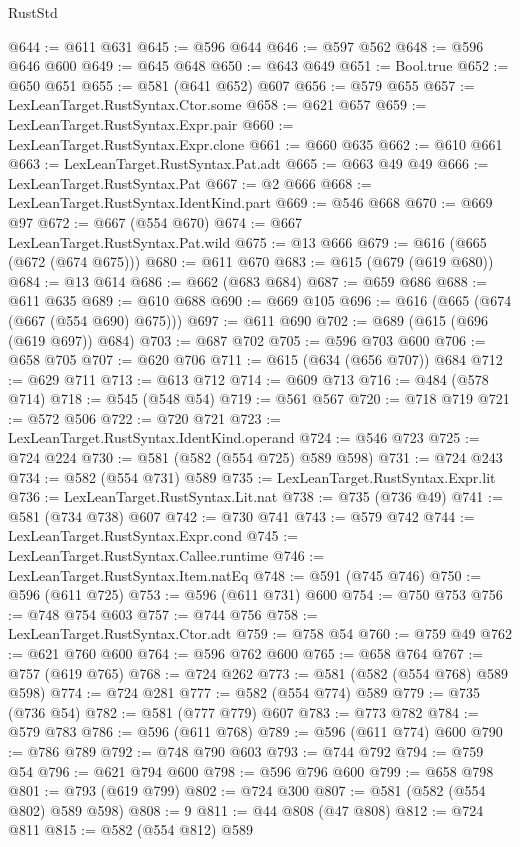 \begin{lexlean}{RustStd}
\begin{coremodule}
@644 := @611 @631
@645 := @596 @644
@646 := @597 @562
@648 := @596 @646 @600
@649 := @645 @648
@650 := @643 @649
@651 := Bool.true
@652 := @650 @651
@655 := @581 (@641 @652) @607
@656 := @579 @655
@657 := LexLeanTarget.RustSyntax.Ctor.some
@658 := @621 @657
@659 := LexLeanTarget.RustSyntax.Expr.pair
@660 := LexLeanTarget.RustSyntax.Expr.clone
@661 := @660 @635
@662 := @610 @661
@663 := LexLeanTarget.RustSyntax.Pat.adt
@665 := @663 @49 @49
@666 := LexLeanTarget.RustSyntax.Pat
@667 := @2 @666
@668 := LexLeanTarget.RustSyntax.IdentKind.part
@669 := @546 @668
@670 := @669 @97
@672 := @667 (@554 @670)
@674 := @667 LexLeanTarget.RustSyntax.Pat.wild
@675 := @13 @666
@679 := @616 (@665 (@672 (@674 @675)))
@680 := @611 @670
@683 := @615 (@679 (@619 @680))
@684 := @13 @614
@686 := @662 (@683 @684)
@687 := @659 @686
@688 := @611 @635
@689 := @610 @688
@690 := @669 @105
@696 := @616 (@665 (@674 (@667 (@554 @690) @675)))
@697 := @611 @690
@702 := @689 (@615 (@696 (@619 @697)) @684)
@703 := @687 @702
@705 := @596 @703 @600
@706 := @658 @705
@707 := @620 @706
@711 := @615 (@634 (@656 @707)) @684
@712 := @629 @711
@713 := @613 @712
@714 := @609 @713
@716 := @484 (@578 @714)
@718 := @545 (@548 @54)
@719 := @561 @567
@720 := @718 @719
@721 := @572 @506
@722 := @720 @721
@723 := LexLeanTarget.RustSyntax.IdentKind.operand
@724 := @546 @723
@725 := @724 @224
@730 := @581 (@582 (@554 @725) @589 @598)
@731 := @724 @243
@734 := @582 (@554 @731) @589
@735 := LexLeanTarget.RustSyntax.Expr.lit
@736 := LexLeanTarget.RustSyntax.Lit.nat
@738 := @735 (@736 @49)
@741 := @581 (@734 @738) @607
@742 := @730 @741
@743 := @579 @742
@744 := LexLeanTarget.RustSyntax.Expr.cond
@745 := LexLeanTarget.RustSyntax.Callee.runtime
@746 := LexLeanTarget.RustSyntax.Item.natEq
@748 := @591 (@745 @746)
@750 := @596 (@611 @725)
@753 := @596 (@611 @731) @600
@754 := @750 @753
@756 := @748 @754 @603
@757 := @744 @756
@758 := LexLeanTarget.RustSyntax.Ctor.adt
@759 := @758 @54
@760 := @759 @49
@762 := @621 @760 @600
@764 := @596 @762 @600
@765 := @658 @764
@767 := @757 (@619 @765)
@768 := @724 @262
@773 := @581 (@582 (@554 @768) @589 @598)
@774 := @724 @281
@777 := @582 (@554 @774) @589
@779 := @735 (@736 @54)
@782 := @581 (@777 @779) @607
@783 := @773 @782
@784 := @579 @783
@786 := @596 (@611 @768)
@789 := @596 (@611 @774) @600
@790 := @786 @789
@792 := @748 @790 @603
@793 := @744 @792
@794 := @759 @54
@796 := @621 @794 @600
@798 := @596 @796 @600
@799 := @658 @798
@801 := @793 (@619 @799)
@802 := @724 @300
@807 := @581 (@582 (@554 @802) @589 @598)
@808 := 9
@811 := @44 @808 (@47 @808)
@812 := @724 @811
@815 := @582 (@554 @812) @589

\end{coremodule}
\end{lexlean}

